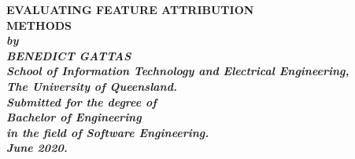 \documentclass[main]{subfiles}
\begin{document}
\begin{titlepage}
\renewcommand{\baselinestretch}{1.0}
\begin{center}
\vspace*{35mm}
\Large\bf
		EVALUATING FEATURE ATTRIBUTION\\
		METHODS\\
\vspace{50mm}
\large\sl
		by\\
		BENEDICT GATTAS
		\medskip\\
\normalsize
		School of Information Technology and Electrical Engineering,\\
		The University of Queensland.\\
\vspace{50mm}
		Submitted for the degree of\\
		Bachelor of Engineering
		\smallskip\\
\normalsize
		in the field of Software Engineering.
		\medskip\\
\normalsize
		June 2020.		
		\medskip\\
\end{center}
\end{titlepage}
\end{document}
